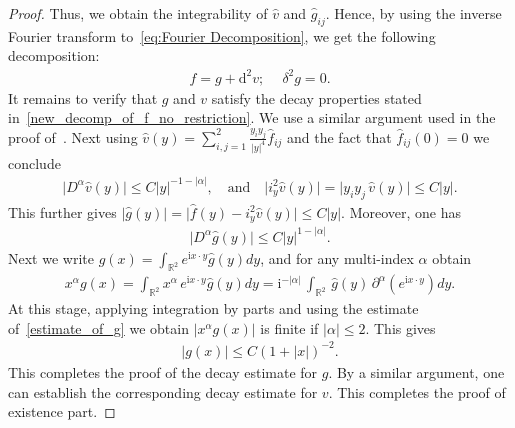 \documentclass[11pt]{article}
\newcommand{\abs}[1]{\lvert #1 \rvert}
\newcommand{\I}{\mathrm{i}}
\newcommand{\D}{\mathrm{d}}
\newcommand{\wh}{\widehat}
\newcommand{\p}{\partial}
\newcommand*{\Rt}{\mathbb{R}^2}
\newcommand{\qum}[1]{\quad\mbox{#1}}
\begin{document}
\begin{proof}
Thus, we obtain the integrability of $\widehat{v}$ and $\wh{g}_{ij}$. Hence, by using the inverse Fourier transform to~\eqref{eq:Fourier Decomposition}, we get the following decomposition:
		\begin{align*}
		f= g+\D^2 v;  \quad \ \delta^{2} g=0.
		\end{align*}
It remains to verify that $g$ and $v$ satisfy the decay properties stated in~\eqref{new_decomp_of_f_no_restriction}.  We use a similar argument used in the proof of~\cite[Theorem 3.4]{Rohit_Suman}. Next using $\displaystyle \wh{v}(y)= \sum_{i,j=1}^2\frac{y_{i} y_{j}}{|y|^{4}}  \widehat{f}_{ij}$ and the fact that $\wh{f}_{ij}(0)=0$ we conclude  
\begin{align*}
 \abs{  D^{\alpha} \wh{v}(y)}\le C \abs{y}^{-1-|\alpha|}, \qum{and} \quad  \abs{i^2_y \wh{v}(y)} =  \abs{y_i y_j\, \wh{v}(y)} \le C \abs{y}.
\end{align*}
This further gives  $\abs{\wh{g}(y)}=\abs{\wh{f}(y)- i^2_y \wh{v}(y)} \le   C \abs{y}$. Moreover, one has 
\begin{align}\label{estimate_of_g}
    \abs{ D^{\alpha} \wh{g}(y)}\le   C \abs{y}^{1-|\alpha|}.
\end{align}
Next we write $g(x)= \int_{\Rt} e^{\I x\cdot y} \wh{g}(y) dy$, and  for any multi-index $\alpha$ obtain
\begin{align}
    x^{\alpha} g(x) = \int_{\Rt}   x^{\alpha} \, e^{\I x \cdot y} \wh{g}(y) dy=  \I^{-|\alpha|}\,\int_{\Rt}    \, \wh{g}(y) \, \p^{\alpha}(e^{\I x \cdot y})  dy.
\end{align}
 At this stage, applying  integration by parts and  using  the estimate of~\eqref{estimate_of_g} we obtain $\abs{x^{\alpha} g(x) }$ is finite if $\abs{\alpha}\le 2$. This gives 
 \begin{align}
     \abs{ g(x) }\le C (1+|x|)^{-2}.
 \end{align}
 This completes the proof of the decay estimate for $g$. By a similar argument, one can establish the corresponding decay estimate for $v$.  This completes the proof of existence part. 
 

\end{proof}
\end{document}
